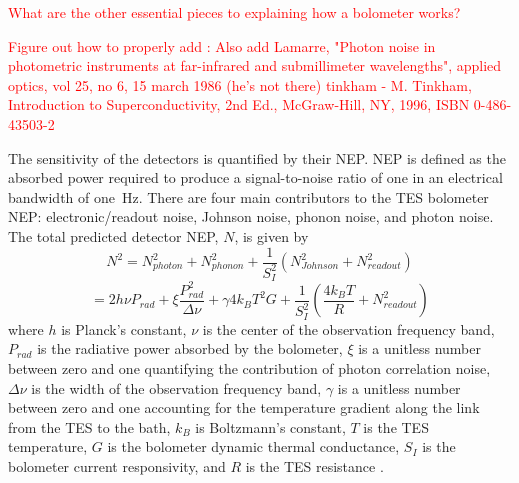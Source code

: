 
\textcolor{red}{What are the other essential pieces to explaining how a bolometer works?}


\textcolor{red}{Figure out how to properly add : 
Also add Lamarre, "Photon noise in photometric instruments at far-infrared and submillimeter wavelengths", applied optics, vol 25, no 6, 15 march 1986 (he's not there)
tinkham - M. Tinkham, Introduction to Superconductivity, 2nd Ed., McGraw-Hill, NY, 1996, ISBN 0-486-43503-2
}


The sensitivity of the detectors is quantified by their \ac{NEP}. 
\ac{NEP} is defined as the absorbed power required to produce a signal-to-noise ratio of one in an electrical bandwidth of one~Hz. 
There are four main contributors to the \ac{TES} bolometer \ac{NEP}: electronic/readout noise, Johnson noise, phonon noise, and photon noise. 
The total predicted detector \ac{NEP}, $N$, is given by 
\begin{equation}
N^{2} = N_{photon}^2 + N_{phonon}^2 + \frac{1}{S_I^2} ( N_{Johnson}^2 + N_{readout}^2 )
\end{equation}
\begin{equation}
= 2h\nu P_{rad} + \xi \frac{P_{rad}^2}{\Delta \nu} + \gamma 4k_{B} T^2 G + \frac{1}{S_I^2} (\frac{4k_{B}T}{R} + N_{readout}^2 )
\label{eq:nep}
\end{equation}
where $h$ is Planck's constant, $\nu$ is the center of the observation frequency band, $P_{rad}$ is the radiative power absorbed by the bolometer, $\xi$ is a unitless number between zero and one quantifying the contribution of photon correlation noise, $\Delta \nu$ is the width of the observation frequency band, $\gamma$ is a unitless number between zero and one accounting for the temperature gradient along the link from the \ac{TES} to the bath, $k_{B}$ is Boltzmann's constant, $T$ is the \ac{TES} temperature, $G$ is the bolometer dynamic thermal conductance, $S_{I}$ is the bolometer current responsivity, and $R$ is the \ac{TES} resistance \cite{Mather1982}. 

